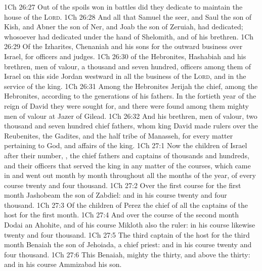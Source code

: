 \vs 1Ch 26:27 Out of the spoils won in battles did they dedicate to maintain the house of the \textsc{Lord}.
\vs 1Ch 26:28 And all that Samuel the seer, and Saul the son of Kish, and Abner the son of Ner, and Joab the son of Zeruiah, had dedicated;  whosoever had dedicated  under the hand of Shelomith, and of his brethren.
\vs 1Ch 26:29 Of the Izharites, Chenaniah and his sons  for the outward business over Israel, for officers and judges.
\vs 1Ch 26:30  of the Hebronites, Hashabiah and his brethren, men of valour, a thousand and seven hundred,  officers among them of Israel on this side Jordan westward in all the business of the \textsc{Lord}, and in the service of the king.
\vs 1Ch 26:31 Among the Hebronites  Jerijah the chief,  among the Hebronites, according to the generations of his fathers. In the fortieth year of the reign of David they were sought for, and there were found among them mighty men of valour at Jazer of Gilead.
\vs 1Ch 26:32 And his brethren, men of valour,  two thousand and seven hundred chief fathers, whom king David made rulers over the Reubenites, the Gadites, and the half tribe of Manasseh, for every matter pertaining to God, and affairs of the king.
\vs 1Ch 27:1 Now the children of Israel after their number, , the chief fathers and captains of thousands and hundreds, and their officers that served the king in any matter of the courses, which came in and went out month by month throughout all the months of the year, of every course  twenty and four thousand.
\vs 1Ch 27:2 Over the first course for the first month  Jashobeam the son of Zabdiel: and in his course  twenty and four thousand.
\vs 1Ch 27:3 Of the children of Perez  the chief of all the captains of the host for the first month.
\vs 1Ch 27:4 And over the course of the second month  Dodai an Ahohite, and of his course  Mikloth also the ruler: in his course likewise  twenty and four thousand.
\vs 1Ch 27:5 The third captain of the host for the third month  Benaiah the son of Jehoiada, a chief priest: and in his course  twenty and four thousand.
\vs 1Ch 27:6 This  Benaiah,  mighty  the thirty, and above the thirty: and in his course  Ammizabad his son.
